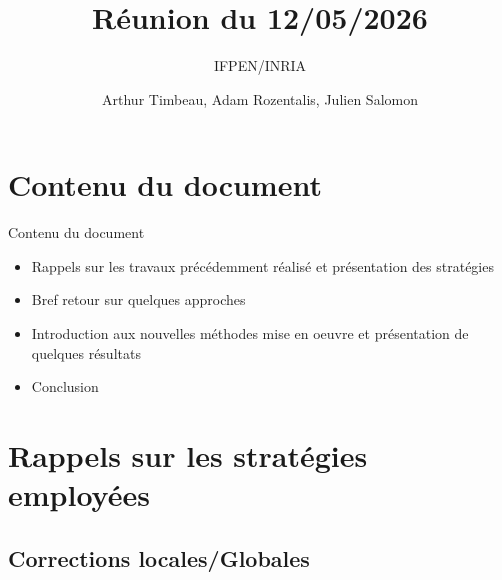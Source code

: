 \documentclass[
11pt,notheorems,hyperref={pdfauthor=whatever}
]{beamer}
\title[
]{Réunion du 12/05/2026}
\subtitle{IFPEN/INRIA}
\author[
]{
    Arthur Timbeau, 
    Adam Rozentalis,
    Julien Salomon
}
\begin{document}

\begin{frame}
  \titlepage
\end{frame}


\begin{frame}
    \tableofcontents
\end{frame}

\section{Contenu du document}

\begin{frame}{Contenu du document}
    \begin{itemize}
        \item Rappels sur les travaux précédemment réalisé et présentation des stratégies 
        \item Bref retour sur quelques approches
        \item Introduction aux nouvelles méthodes mise en oeuvre et présentation de quelques résultats
        \item Conclusion
    \end{itemize}    
\end{frame}




\section{Rappels sur les stratégies employées}

\subsection{Corrections locales/Globales}
\end{document}

